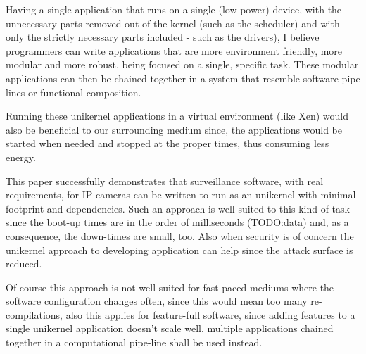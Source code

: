 \documentclass[10pt,a4paper,twoside]{article}
\begin{document}
Having a single application that runs on a single (low-power) device, with the unnecessary parts removed out
of the kernel (such as the scheduler) and with only the strictly necessary parts included - such as the drivers),
I believe programmers can write applications that are more environment friendly,
more modular and more robust, being focused on a single, specific task. These modular applications can then be chained together in a system that resemble software pipe lines or functional composition.

Running these unikernel applications in a virtual environment (like Xen) would also be
beneficial to our surrounding medium since, the applications would be started when
needed and stopped at the proper times, thus consuming less energy. \cite{DataCenterEnergyForeCast} \cite{JinWenChen}

This paper successfully demonstrates that surveillance software, with real requirements,
 for IP cameras can be written to run as an unikernel with minimal footprint and dependencies. Such an approach is well suited to this kind of task since the boot-up times are in the order of milliseconds (TODO:data) and, as a consequence, the down-times are small, too. Also when security is of concern the unikernel approach to developing application can help since the attack surface is reduced.

 Of course this approach is not well suited for fast-paced mediums where the software configuration changes often,
 since this would mean too many re-compilations, also this applies for feature-full software, since adding features to a single unikernel application doesn't scale well, multiple applications chained together in a computational pipe-line shall be used instead.
\end{document}
